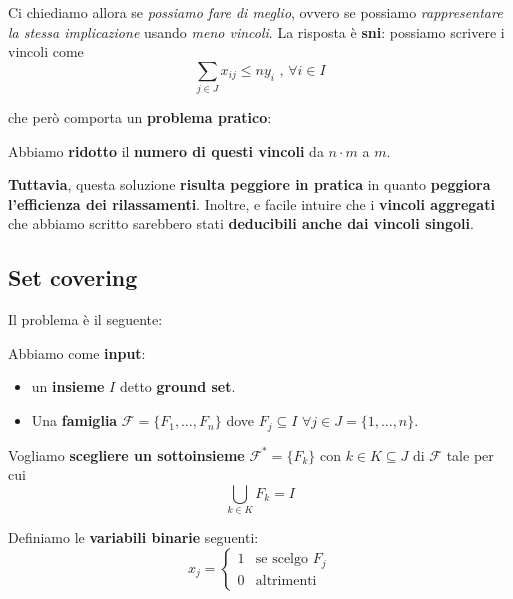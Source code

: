 Ci chiediamo allora se \textit{possiamo fare di meglio}, ovvero
se possiamo \textit{rappresentare la stessa implicazione}
usando \textit{meno vincoli}.
La risposta è \textbf{sni}: possiamo scrivere i vincoli come
\[
    \sum_{j\in J} x_{ij} \le ny_i \text{ , } \forall i \in I
\]

che però comporta un \textbf{problema pratico}:

\begin{remark}[COMPROMESSO]
    Abbiamo \textbf{ridotto} il \textbf{numero di questi vincoli} 
    da $n \cdot m$ a $m$.

    \textbf{Tuttavia}, questa soluzione \textbf{risulta peggiore in pratica}
    in quanto \textbf{peggiora l'efficienza dei rilassamenti}. 
    Inoltre, e facile intuire che i \textbf{vincoli aggregati} che
    abbiamo scritto sarebbero stati \textbf{deducibili anche dai vincoli singoli}.
\end{remark}

\subsection{Set covering}

Il problema è il seguente:

\begin{exa}
    Abbiamo come \textbf{input}:
    \begin{itemize}
        \item un \textbf{insieme} $I$ detto \textbf{ground set}.
        \item Una \textbf{famiglia} $\mathcal{F} = \{ F_{1}, \ldots , F_n\}$ 
            dove $F_j \subseteq I$ $\forall j \in J = \{1,\ldots ,n\}  $.
    \end{itemize}
    Vogliamo \textbf{scegliere un sottoinsieme} $\mathcal{F}^* = \{F_k\}$ 
    con $k \in K \subseteq J$ di $\mathcal{F}$ tale per cui
    \[
        \bigcup_{k \in K} F_k = I
    \] 
\end{exa}

Definiamo le \textbf{variabili binarie} seguenti:
\[
    x_j = \begin{cases}
        1 & \text{se scelgo } F_j \\ 
        0 & \text{altrimenti}
    \end{cases}
\]

